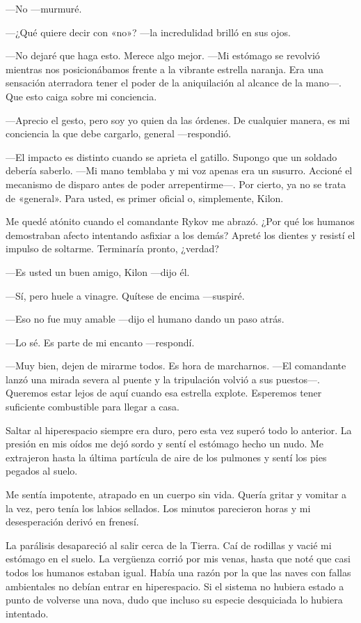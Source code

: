 —No —murmuré.

 —¿Qué quiere decir con «no»? —la incredulidad brilló en sus ojos.

—No dejaré que haga esto. Merece algo mejor. —Mi estómago se revolvió mientras nos posicionábamos frente a la vibrante estrella naranja. Era una sensación aterradora tener el poder de la aniquilación al alcance de la mano—. Que esto caiga sobre mi conciencia.

—Aprecio el gesto, pero soy yo quien da las órdenes. De cualquier manera, es mi conciencia la que debe cargarlo, general —respondió.

—El impacto es distinto cuando se aprieta el gatillo. Supongo que un soldado debería saberlo. —Mi mano temblaba y mi voz apenas era un susurro. Accioné el mecanismo de disparo antes de poder arrepentirme—. Por cierto, ya no se trata de «general». Para usted, es primer oficial o, simplemente, Kilon.

Me quedé atónito cuando el comandante Rykov me abrazó. ¿Por qué los humanos demostraban afecto intentando asfixiar a los demás? Apreté los dientes y resistí el impulso de soltarme. Terminaría pronto, ¿verdad?

—Es usted un buen amigo, Kilon —dijo él.

—Sí, pero huele a vinagre. Quítese de encima —suspiré.

—Eso no fue muy amable —dijo el humano dando un paso atrás.

—Lo sé. Es parte de mi encanto —respondí.

—Muy bien, dejen de mirarme todos. Es hora de marcharnos. —El comandante lanzó una mirada severa al puente y la tripulación volvió a sus puestos—. Queremos estar lejos de aquí cuando esa estrella explote. Esperemos tener suficiente combustible para llegar a casa.

Saltar al hiperespacio siempre era duro, pero esta vez superó todo lo anterior. La presión en mis oídos me dejó sordo y sentí el estómago hecho un nudo. Me extrajeron hasta la última partícula de aire de los pulmones y sentí los pies pegados al suelo.

Me sentía impotente, atrapado en un cuerpo sin vida. Quería gritar y vomitar a la vez, pero tenía los labios sellados. Los minutos parecieron horas y mi desesperación derivó en frenesí.

La parálisis desapareció al salir cerca de la Tierra. Caí de rodillas y vacié mi estómago en el suelo. La vergüenza corrió por mis venas, hasta que noté que casi todos los humanos estaban igual. Había una razón por la que las naves con fallas ambientales no debían entrar en hiperespacio. Si el sistema no hubiera estado a punto de volverse una nova, dudo que incluso su especie desquiciada lo hubiera intentado.

